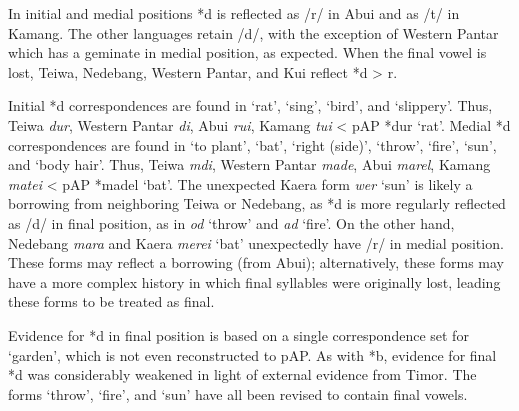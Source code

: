 In initial and medial positions *d is reflected as /r/ in Abui and as /t/ in Kamang. The other languages retain /d/, with the exception of Western Pantar which has a geminate in medial position, as expected. When the final vowel is lost, Teiwa, Nedebang, Western Pantar, and Kui reflect *d {\textgreater} r. 

Initial *d correspondences are found in `rat', `sing', `bird', and `slippery'. Thus, Teiwa \textit{dur}, Western Pantar \textit{di}, Abui \textit{rui}, Kamang \textit{tui} {\textless} pAP *dur `rat'. Medial *d correspondences are found in `to plant', `bat', `right (side)', `throw', `fire', `sun', and `body hair'. Thus, Teiwa \textit{m{\textschwa}di}, Western Pantar \textit{mad{\textlengthmark}e}, Abui \textit{marel}, Kamang \textit{matei} {\textless} pAP *madel\textit{ }`bat'. The unexpected Kaera form \textit{wer }`sun' is likely a borrowing from neighboring Teiwa or Nedebang, as *d is more regularly reflected as /d/ in final position, as in \textit{od }`throw' and \textit{ad }`fire'. On the other hand, Nedebang \textit{mara }and Kaera \textit{merei} `bat' unexpectedly have /r/ in medial position. These forms may reflect a borrowing (from Abui); alternatively, these forms may have a more complex history in which final syllables were originally lost, leading these forms to be treated as final. 

Evidence for *d in final position is based on a single correspondence set for `garden', which is not even reconstructed to pAP. As with *b, evidence for final *d was considerably weakened in light of external evidence from Timor. The forms `throw', `fire', and `sun' have all been revised to contain final vowels. 


